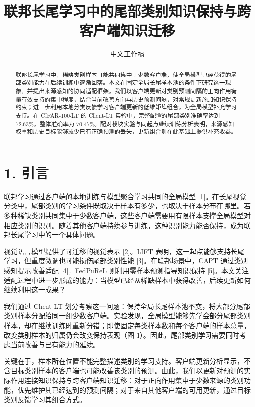 \documentclass[10pt,twocolumn,letterpaper]{article}
\author{中文工作稿}
\date{}
\title{联邦长尾学习中的尾部类别知识保持与跨客户端知识迁移}
\begin{document}
\maketitle

\begin{abstract}

联邦长尾学习中，稀缺类别样本可能共同集中于少数客户端，使全局模型已经获得的尾部类别能力在后续训练中逐渐回落。本文在固定全局长尾样本池的条件下研究这一现象，并提出来源感知的协同适配框架。我们以客户端更新对类别预测间隔的正向作用衡量有效支持的集中程度，结合当前改善方向与历史预测间隔，对常规更新施加知识保持约束；进一步利用本地分类反馈学习客户端更新的低维矩阵组合，为全局模型补充学习支持。在 CIFAR-100-LT 的 Client-LT 实验中，完整配置的尾部类别准确率达到 72.63\%，整体准确率为 70.47\%。配对模块实验与同起点继续训练分析表明，来源感知权重和历史目标能够减少已有正确预测的丢失，更新组合则在此基础上提供补充收益。


\end{abstract}

\section*{1. 引言}

联邦学习通过客户端的本地训练与模型聚合学习共同的全局模型 [1]。在长尾视觉分类中，尾部类别的学习条件既取决于样本有多少，也取决于样本分布在哪里。若多种稀缺类别共同集中于少数客户端，这些客户端需要用有限样本支撑全局模型对相应类别的识别。随着其他客户端持续参与训练，这种识别能力能否保持，成为联邦长尾学习中的一个具体问题。


视觉语言模型提供了可迁移的视觉表示 [2]。LIFT 表明，这一起点能够支持长尾学习，但重度微调也可能损伤尾部类别性能 [3]。在联邦场景中，CAPT 通过类别感知提示改善适配 [4]，FedPuReL 则利用零样本预测指导知识保持 [5]。本文关注适配过程中进一步形成的能力：当模型已经从稀缺样本中获得改善，后续更新如何继续利用这一成果？


我们通过 Client-LT 划分考察这一问题：保持全局长尾样本池不变，将大部分尾部类别样本分配给同一组少数客户端。实验发现，全局模型能够先学会部分尾部类别样本，却在继续训练时重新分错；即使固定每类样本数和每个客户端的样本总量，改变类别样本的归属仍会改变保持表现（图 1）。因此，尾部类别学习需要同时考虑当前改善与已有能力的延续。


关键在于，样本所在位置不能完整描述类别的学习支持。客户端更新分析显示，不含目标类别样本的客户端也可能改善该类别的预测。由此，我们以更新对预测的实际作用连接知识保持与跨客户端知识迁移：对于正向作用集中于少数来源的类别功能，优先维护其已经达到的预测间隔；对于来自其他客户端的可用更新，通过目标类别反馈学习其组合方式。
\end{document}
